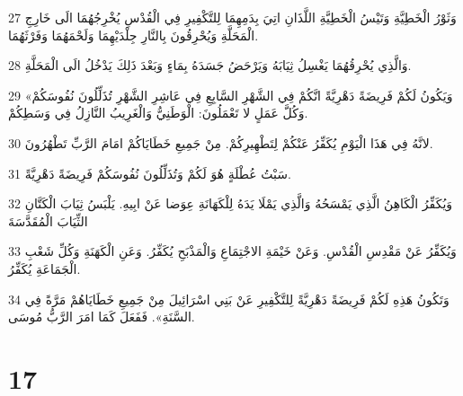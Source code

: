\par 27 وَثَوْرُ الْخَطِيَّةِ وَتَيْسُ الْخَطِيَّةِ اللَّذَانِ اتِيَ بِدَمِهِمَا لِلتَّكْفِيرِ فِي الْقُدْسِ يُخْرِجُهُمَا الَى خَارِجِ الْمَحَلَّةِ وَيُحْرِقُونَ بِالنَّارِ جِلْدَيْهِمَا وَلَحْمَهُمَا وَفَرْثَهُمَا.
\par 28 وَالَّذِي يُحْرِقُهُمَا يَغْسِلُ ثِيَابَهُ وَيَرْحَضُ جَسَدَهُ بِمَاءٍ وَبَعْدَ ذَلِكَ يَدْخُلُ الَى الْمَحَلَّةِ.
\par 29 «وَيَكُونُ لَكُمْ فَرِيضَةً دَهْرِيَّةً انَّكُمْ فِي الشَّهْرِ السَّابِعِ فِي عَاشِرِ الشَّهْرِ تُذَلِّلُونَ نُفُوسَكُمْ وَكُلَّ عَمَلٍ لا تَعْمَلُونَ: الْوَطَنِيُّ وَالْغَرِيبُ النَّازِلُ فِي وَسَطِكُمْ.
\par 30 لانَّهُ فِي هَذَا الْيَوْمِ يُكَفِّرُ عَنْكُمْ لِتَطْهِيرِكُمْ. مِنْ جَمِيعِ خَطَايَاكُمْ امَامَ الرَّبِّ تَطْهُرُونَ.
\par 31 سَبْتُ عُطْلَةٍ هُوَ لَكُمْ وَتُذَلِّلُونَ نُفُوسَكُمْ فَرِيضَةً دَهْرِيَّةً.
\par 32 وَيُكَفِّرُ الْكَاهِنُ الَّذِي يَمْسَحُهُ وَالَّذِي يَمْلَا يَدَهُ لِلْكَهَانَةِ عِوَضا عَنْ ابِيهِ. يَلْبَسُ ثِيَابَ الْكَتَّانِ الثِّيَابَ الْمُقَدَّسَةَ
\par 33 وَيُكَفِّرُ عَنْ مَقْدِسِ الْقُدْسِ. وَعَنْ خَيْمَةِ الاجْتِمَاعِ وَالْمَذْبَحِ يُكَفِّرُ. وَعَنِ الْكَهَنَةِ وَكُلِّ شَعْبِ الْجَمَاعَةِ يُكَفِّرُ.
\par 34 وَتَكُونُ هَذِهِ لَكُمْ فَرِيضَةً دَهْرِيَّةً لِلتَّكْفِيرِ عَنْ بَنِي اسْرَائِيلَ مِنْ جَمِيعِ خَطَايَاهُمْ مَرَّةً فِي السَّنَةِ». فَفَعَلَ كَمَا امَرَ الرَّبُّ مُوسَى.

\chapter{17}


